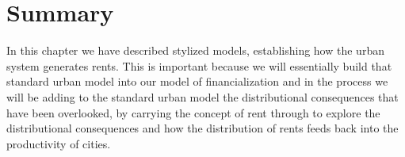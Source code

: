 \section{Summary}
In this chapter we have described stylized models, establishing how the urban system generates rents. %
This is important because we will essentially build that standard urban model into our model of financialization and in the process we will be adding to the standard urban model the distributional consequences that have been overlooked, by carrying the concept of rent through to explore the distributional consequences and how the distribution of rents feeds back into the productivity of cities. 

